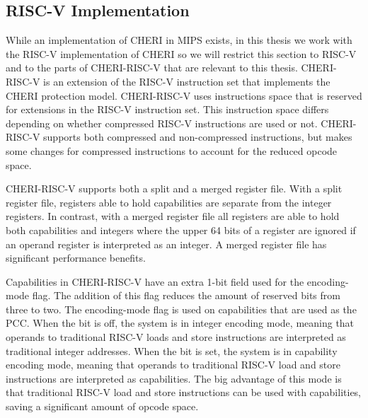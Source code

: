 \subsection{RISC-V Implementation}
\label{sec:cheri-risc-v}
While an implementation of CHERI in MIPS exists, in this thesis we work with the RISC-V implementation of CHERI so we will restrict this section to RISC-V and to the parts of CHERI-RISC-V that are relevant to this thesis. CHERI-RISC-V is an extension of the RISC-V instruction set that implements the CHERI protection model. CHERI-RISC-V uses instructions space that is reserved for extensions in the RISC-V instruction set. This instruction space differs depending on whether compressed RISC-V instructions are used or not. CHERI-RISC-V supports both compressed and non-compressed instructions, but makes some changes for compressed instructions to account for the reduced opcode space.

CHERI-RISC-V supports both a split and a merged register file. With a split register file, registers able to hold capabilities are separate from the integer registers. In contrast, with a merged register file all registers are able to hold both capabilities and integers where the upper 64 bits of a register are ignored if an operand register is interpreted as an integer. A merged register file has significant performance benefits.

Capabilities in CHERI-RISC-V have an extra 1-bit field used for the encoding-mode flag. The addition of this flag reduces the amount of reserved bits from three to two. The encoding-mode flag is used on capabilities that are used as the PCC. When the bit is off, the system is in integer encoding mode, meaning that operands to traditional RISC-V loads and store instructions are interpreted as traditional integer addresses. When the bit is set, the system is in capability encoding mode, meaning that operands to traditional RISC-V load and store instructions are interpreted as capabilities. The big advantage of this mode is that traditional RISC-V load and store instructions can be used with capabilities, saving a significant amount of opcode space.

